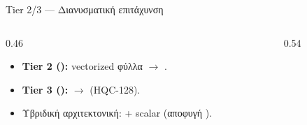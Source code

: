 \begin{frame}{Tier 2/3 — Διανυσματική επιτάχυνση}
  \begin{columns}[T]
    \begin{column}{0.46\textwidth}
      \begin{itemize}
        \item \textbf{Tier 2 (\RVV):} vectorized  φύλλα $\rightarrow$  .
        \item \textbf{Tier 3 (\Zvbc):} \vclmul $\rightarrow$   (HQC-128).
        \item Υβριδική αρχιτεκτονική: \RVV {} + scalar  (αποφυγή ).
      \end{itemize}
    \end{column}
    \begin{column}{0.54\textwidth}
      \resizebox{\linewidth}{!}{}
    \end{column}
  \end{columns}
\end{frame}
